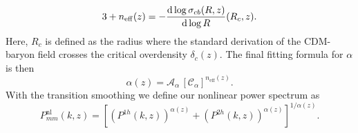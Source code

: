 \documentclass[../main.tex]{subfiles}
\begin{document}
\begin{equation}
    3+n_\mathrm{eff}(z) = - \frac{\mathrm{d} \log \sigma_{cb}(R,z)}{\mathrm{d} \log R}(R_c,z).
\end{equation}
Here, $R_c$ is defined as the radius where the standard derivation of the CDM-baryon field crosses the critical overdensity $\delta_c(z)$. The final fitting formula for $\alpha$ is then \begin{equation}
    \alpha(z) = \mathcal{A}_\alpha\,\left[\mathcal{C}_\alpha\right]^{n_\mathrm{eff}(z)}.
\end{equation}
With the transition smoothing we define our nonlinear power spectrum as \begin{equation}
    P^{\mathrm{nl}}_{mm}(k,z) = \left[\left(P^{1h}(k,z)\right)^{\alpha(z)} + \left(P^{2h}(k,z)\right)^{\alpha(z)} \right]^{1/\alpha(z)} .
\end{equation}
\end{document}
